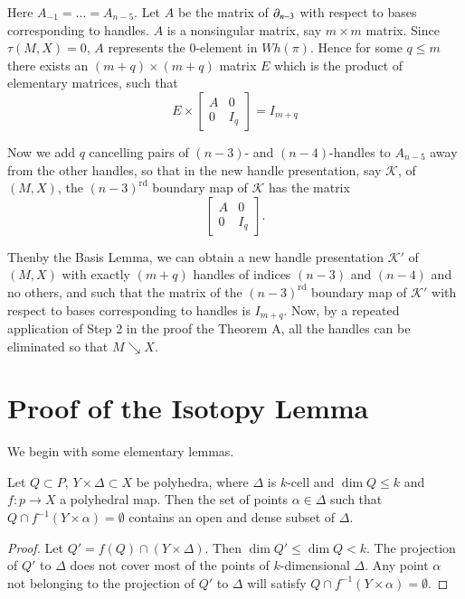 Here $A_{-1}=\ldots=A_{n-5}$. Let $A$ be the matrix of $\partial_{n-3}$ with respect to bases corresponding to handles. $A$ is a nonsingular matrix, say $m\times m$ matrix. Since $\tau(M,X)=0$, $A$ represents the $0$-element in $Wh(\pi)$. Hence for some $q\leq m$ there exists an $(m+q)\times (m+q)$ matrix $E$ which is the product of elementary matrices, such that 
$$
E\times 
\begin{bmatrix}
A &0\\
0 & I_{q}
\end{bmatrix}
=I_{m+q}
$$

Now we add $q$ cancelling pairs of $(n-3)$- and $(n-4)$-handles to $A_{n-5}$ away from the other handles, so that in the new handle presentation, say $\mathscr{K}$, of $(M,X)$, the $(n-3)^{\text{rd}}$ boundary map of $\mathscr{K}$ has the matrix
$$
\begin{bmatrix}
A &0\\
0 & I_{q}
\end{bmatrix}.
$$

Then\pageoriginale by the Basis Lemma, we can obtain a new handle presentation $\mathscr{K}'$ of $(M,X)$ with exactly $(m+q)$ handles of indices $(n-3)$ and $(n-4)$ and no others, and such that the matrix of the $(n-3)^{\text{rd}}$ boundary map of $\mathscr{K}'$ with respect to bases corresponding to handles is $I_{m+q}$. Now, by a repeated application of Step 2 in the proof the Theorem A, all the handles can be eliminated so that $M\searrow X$.

\section{Proof of the Isotopy Lemma}\label{chap8-sec8.11}

We begin with some elementary lemmas.

\begin{lemma}\label{chap8-lem8.11.1}
Let $Q\subset P$, $Y\times \Delta \subset X$ be polyhedra, where $\Delta$ is $k$-cell and $\dim Q\leq k$ and $f:p\to X$ a polyhedral map. Then the set of points $\alpha\in\Delta$ such that $Q\cap f^{-1}(Y\times\alpha)=\emptyset$ contains an open and dense subset of $\Delta$.
\end{lemma}

\begin{proof}
Let $Q'=f(Q)\cap (Y\times \Delta)$. Then $\dim Q'\leq \dim Q<k$. The projection of $Q'$ to $\Delta$ does not cover most of the points of $k$-dimensional $\Delta$. Any point $\alpha$ not belonging to the projection of $Q'$ to $\Delta$ will satisfy $Q\cap f^{-1}(Y\times \alpha)=\emptyset$.
\end{proof}

